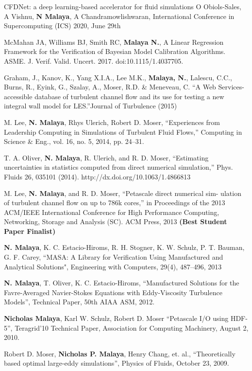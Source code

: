 %

CFDNet: a deep learning-based accelerator for fluid simulations
O Obiols-Sales, A Vishnu, \textbf{N Malaya}, A Chandramowlishwaran,
International Conference in Supercomputing (ICS) 2020, June 29th

\blankline

McMahan JA, Williams BJ, Smith RC, \textbf{Malaya N.}, A Linear Regression
Framework for the Verification of Bayesian Model Calibration
Algorithms. ASME. J. Verif. Valid. Uncert. 2017. doi:10.1115/1.4037705. 

\blankline

 Graham, J., Kanov, K., Yang X.I.A., Lee M.K., \textbf{Malaya, N.}, 
Lalescu, C.C., Burns, R., Eyink, G., Szalay, A., Moser, R.D. \& 
Meneveau, C. ``A Web Services-accessible database of turbulent channel
flow and its use for testing a new integral wall model for LES.''Journal
of Turbulence  (2015)

\blankline

M. Lee, \textbf{N. Malaya}, Rhys Ulerich, Robert D. Moser,  “Experiences from
Leadership Computing in Simulations of Turbulent Fluid Flows,”
Computing in Science \& Eng., vol. 16, no. 5, 2014, pp. 24–31.

\blankline

T. A. Oliver, \textbf{N. Malaya}, R. Ulerich, and R. D. Moser, “Estimating
uncertainties in statistics computed from direct numerical simulation,”
Phys. Fluids 26, 035101 (2014). http://dx.doi.org/10.1063/1.4866813 

\blankline

M. Lee, \textbf{N. Malaya}, and R. D. Moser, ``Petascale direct numerical sim-
ulation of turbulent channel flow on up to 786k cores,'' in Proceedings
of the 2013 ACM/IEEE International Conference for High Performance
Computing, Networking, Storage and Analysis (SC). ACM Press, 2013 {\bf(Best
Student Paper Finalist)}

\blankline

\textbf{N. Malaya}, K. C. Estacio-Hiroms, R. H. Stogner, K. W. Schulz, P. T. Bauman,
G. F. Carey, ``MASA: A Library for Verification Using Manufactured and
Analytical Solutions", Engineering with Computers, 29(4), 487--496, 2013

\blankline

\textbf{N. Malaya}, T. Oliver, K. C. Estacio-Hiroms, ``Manufactured Solutions for
the Favre-Averaged Navier-Stokes Equations 
with Eddy-Viscosity Turbulence Models'', Technical Paper, 50th AIAA ASM, 2012.

\blankline

\textbf{Nicholas Malaya}, Karl W. Schulz, Robert D. Moser
``Petascale I/O using HDF-5'', Teragrid'10 Technical Paper, Association for Computing Machinery,
August 2, 2010.

\blankline

Robert D. Moser, \textbf{Nicholas P. Malaya}, Henry Chang, et. al.,
``Theoretically based optimal large-eddy simulations'', Physics of Fluids, October 23, 2009.

